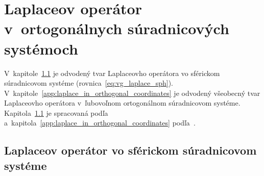 \documentclass[a4paper, 12pt]{book}
\begin{document}
\chapter{Laplaceov operátor v~ortogonálnych súradnicových systémoch}
\label{app:laplace_in_spherical_coordinates}

V~kapitole~\ref{app:laplace_in_spherical_system} je odvodený tvar Laplaceovho 
operátora vo sférickom súradnicovom systéme (rovnica~\ref{eq:vg_laplace_sph}).  
V~kapitole~\ref{app:laplace_in_orthogonal_coordinates} je odvodený všeobecný 
tvar Laplaceovho operátora v~ľubovoľnom ortogonálnom súradnicovom systéme.  
Kapitola~\ref{app:laplace_in_spherical_system} je spracovaná 
podľa~\textcite{MichelLectures} 
a~kapitola~\ref{app:laplace_in_orthogonal_coordinates} 
podľa~\textcite{SansoGeoidDetermination}.


\section{Laplaceov operátor vo sférickom súradnicovom systéme}
\label{app:laplace_in_spherical_system}
\end{document}
